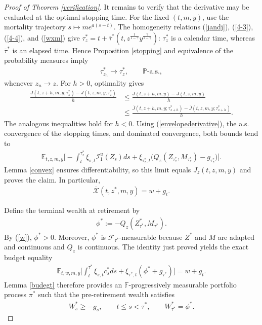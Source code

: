 \documentclass[a4paper,11pt]{amsart}
\numberwithin{equation}{section}
\newcommand{\blue}[1]{{\color{black}#1}}
\begin{document}
{\begin{proof}[Proof of Theorem \ref{verification}]
\blue{It remains to verify that the derivative may be evaluated at the optimal stopping time. For the fixed $(t,m,y)$, use the mortality trajectory $s\mapsto me^{a(s-t)}$. The homogeneity relations (\ref{jandj}), (\ref{4-3}), (\ref{4-4}), and (\ref{wxm}) give $\tau_z^\ast=t+\overline\tau^\ast(t,z^{\frac{1}{1-\gamma}}y^{\frac{\gamma}{1-\gamma}})$: $\tau_z^\ast$ is a calendar time, whereas $\overline\tau^\ast$ is an elapsed time. Hence Proposition \ref{stopping} and equivalence of the probability measures imply}
\begin{align*}
\tau_{z_n}^\ast\longrightarrow\tau_z^\ast,\qquad\mathbb P\text{-a.s.},
\end{align*}
whenever $z_n\to z$. For $h>0$, optimality gives
\begin{align*}
\frac{\overline J(t,z+h,m,y;\tau_z^\ast)-\overline J(t,z,m,y;\tau_z^\ast)}{h}
&\leq\frac{J(t,z+h,m,y)-J(t,z,m,y)}{h}\\
&\leq\frac{\overline J(t,z+h,m,y;\tau_{z+h}^\ast)-\overline J(t,z,m,y;\tau_{z+h}^\ast)}{h}.
\end{align*}
The analogous inequalities hold for $h<0$. Using (\ref{envelopederivative}), the a.s. convergence of the stopping times, and dominated convergence, both bounds tend to
\begin{align*}
\mathbb E_{t,z,m,y}\bigg[-\int_t^{\tau_z^\ast}\xi_{s,t}\mathcal I_1^u(Z_s)ds+\xi_{\tau_z^\ast,t}\big(Q_z(Z_{\tau_z^\ast},M_{\tau_z^\ast})-g_{\tau_z^\ast}\big)\bigg].
\end{align*}
Lemma \ref{convex} ensures differentiability, so this limit equals $J_z(t,z,m,y)$ and proves the claim. In particular,
\begin{align*}
\overline{\mathcal X}(t,z^\ast,m,y)=w+g_t.
\end{align*}


Define the terminal wealth at retirement by
\begin{align*}
\phi^\ast:=-Q_z(Z_{\tau^\ast}^\ast,M_{\tau^\ast}).
\end{align*}
By (\ref{w}), $\phi^\ast>0$. Moreover, $\phi^\ast$ is $\mathcal F_{\tau^\ast}$-measurable because $Z^\ast$ and $M$ are adapted and continuous and $Q_z$ is continuous. The identity just proved yields the exact budget equality
\begin{align*}
\mathbb E_{t,w,m,y}\bigg[\int_t^{\tau^\ast}\xi_{s,t}c_s^\ast ds+\xi_{\tau^\ast,t}(\phi^\ast+g_{\tau^\ast})\bigg]=w+g_t.
\end{align*}
Lemma \ref{budegt} therefore provides an $\mathbb F$-progressively measurable portfolio process $\pi^\ast$ such that the pre-retirement wealth satisfies
\begin{align*}
W_s^\ast\geq-g_s,\qquad t\leq s<\tau^\ast,\qquad W_{\tau^\ast}^\ast=\phi^\ast.
\end{align*}


\end{proof}}
\end{document}
